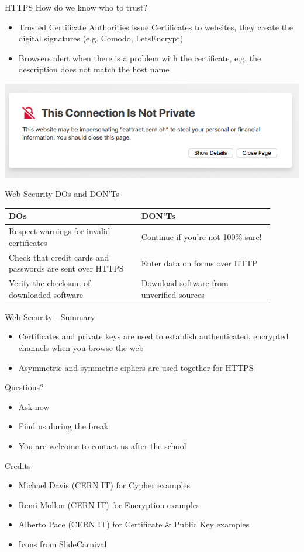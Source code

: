 \documentclass{beamer}
\begin{document}
\begin{frame}{HTTPS}
How do we know who to trust?
\begin{itemize}
\item Trusted Certificate Authorities issue Certificates to websites, they create the digital signatures (e.g. Comodo, LetsEncrypt)
\item Browsers alert when there is a problem with the certificate, e.g. the description does not match the host name
\end{itemize}
\begin{center}
\includegraphics[width=0.5\linewidth]{certificate-error.png}
\end{center}
\end{frame}

\begin{frame}{Web Security DOs and DON'Ts}
\begin{center}
\begin{tabular}{ |p{0.45\linewidth}|p{0.45\linewidth}| }
\hline
\textbf{DOs} & \textbf{DON'Ts} \\ \hline \hline
Respect warnings for invalid certificates & Continue if you're not 100\% sure!\\ \hline
Check that credit cards and passwords are sent over HTTPS & Enter data on forms over HTTP\\ \hline
Verify the checksum of downloaded software & Download software from unverified sources\\ \hline 
\end{tabular}
\end{center}
\end{frame}


\begin{frame}{Web Security - Summary}
\begin{itemize}
\item Certificates and private keys are used to establish authenticated, encrypted channels when you browse the web
\item Asymmetric and symmetric ciphers are used together for HTTPS
\end{itemize}
\end{frame}

\begin{frame}{Questions?}
\begin{itemize}
\item Ask now
\item Find us during the break
\item You are welcome to contact us after the school
\end{itemize}
\end{frame}

\begin{frame}{Credits}
	\begin{itemize}
		\item Michael Davis (CERN IT) for Cypher examples
		\item Remi Mollon (CERN IT) for Encryption examples
        \item Alberto Pace (CERN IT) for Certificate \& Public Key examples
        \item Icons from SlideCarnival
	\end{itemize}
\end{frame}

\backcover
\end{document}
